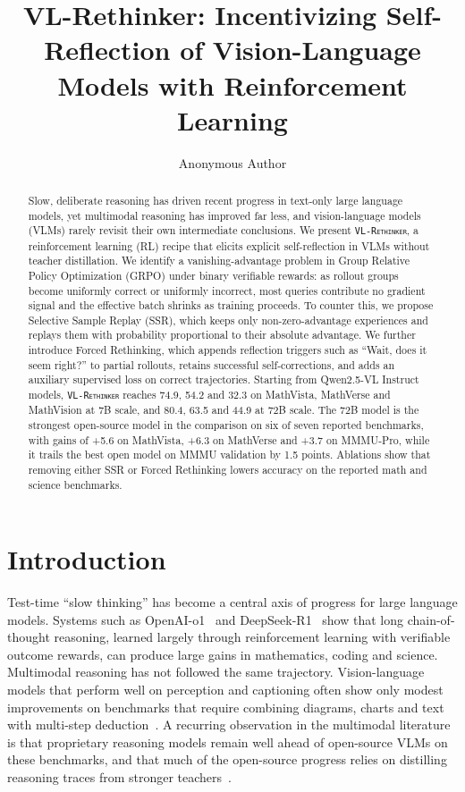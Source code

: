 \documentclass{article}
\title{VL-Rethinker: Incentivizing Self-Reflection of Vision-Language Models with Reinforcement Learning}
\author{Anonymous Author}
\newcommand{\model}{\texttt{\textsc{VL-Rethinker}}\xspace}
\begin{document}
\maketitle

\begin{abstract}
Slow, deliberate reasoning has driven recent progress in text-only large language models, yet multimodal reasoning has improved far less, and vision-language models (VLMs) rarely revisit their own intermediate conclusions. We present \model, a reinforcement learning (RL) recipe that elicits explicit self-reflection in VLMs without teacher distillation. We identify a vanishing-advantage problem in Group Relative Policy Optimization (GRPO) under binary verifiable rewards: as rollout groups become uniformly correct or uniformly incorrect, most queries contribute no gradient signal and the effective batch shrinks as training proceeds. To counter this, we propose Selective Sample Replay (SSR), which keeps only non-zero-advantage experiences and replays them with probability proportional to their absolute advantage. We further introduce Forced Rethinking, which appends reflection triggers such as ``Wait, does it seem right?'' to partial rollouts, retains successful self-corrections, and adds an auxiliary supervised loss on correct trajectories. Starting from Qwen2.5-VL Instruct models, \model reaches 74.9, 54.2 and 32.3 on MathVista, MathVerse and MathVision at 7B scale, and 80.4, 63.5 and 44.9 at 72B scale. The 72B model is the strongest open-source model in the comparison on six of seven reported benchmarks, with gains of +5.6 on MathVista, +6.3 on MathVerse and +3.7 on MMMU-Pro, while it trails the best open model on MMMU validation by 1.5 points. Ablations show that removing either SSR or Forced Rethinking lowers accuracy on the reported math and science benchmarks.
\end{abstract}

\section{Introduction}

Test-time ``slow thinking'' has become a central axis of progress for large language models. Systems such as OpenAI-o1~\cite{openai-o1} and DeepSeek-R1~\cite{deepseek-r1} show that long chain-of-thought reasoning, learned largely through reinforcement learning with verifiable outcome rewards, can produce large gains in mathematics, coding and science. Multimodal reasoning has not followed the same trajectory. Vision-language models that perform well on perception and captioning often show only modest improvements on benchmarks that require combining diagrams, charts and text with multi-step deduction~\cite{mathvista,mathverse,mathvision,mmmupro,emma}. A recurring observation in the multimodal literature is that proprietary reasoning models remain well ahead of open-source VLMs on these benchmarks, and that much of the open-source progress relies on distilling reasoning traces from stronger teachers~\cite{llavacot,Mulberry,llamav_o1,insight_v}.
\end{document}
